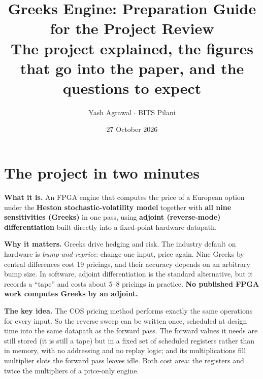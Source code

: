 \documentclass[11pt,a4paper]{article}
\title{\textbf{Greeks Engine: Preparation Guide for the Project Review}\\[3pt]
\large The project explained, the figures that go into the paper, and the questions to expect}
\author{Yash Agrawal \quad $\cdot$ \quad BITS Pilani}
\date{27 October 2026}
\begin{document}
\maketitle
\tableofcontents
\bigskip

\section{The project in two minutes}
\textbf{What it is.} An FPGA engine that computes the price of a European option under the
\textbf{Heston stochastic-volatility model} together with \textbf{all nine sensitivities
(Greeks)} in one pass, using \textbf{adjoint (reverse-mode) differentiation} built directly
into a fixed-point hardware datapath.

\textbf{Why it matters.} Greeks drive hedging and risk. The industry default on hardware is
\emph{bump-and-reprice}: change one input, price again. Nine Greeks by central differences
cost 19 pricings, and their accuracy depends on an arbitrary bump size. In software, adjoint
differentiation is the standard alternative, but it records a ``tape'' and costs about 5--8
pricings in practice. \textbf{No published FPGA work computes Greeks by an adjoint.}

\textbf{The key idea.} The COS pricing method performs exactly the same operations for every
input. So the reverse sweep can be written once, scheduled at design time into the same
datapath as the forward pass. The forward values it needs are still stored (it is still a
tape) but in a fixed set of scheduled registers rather than in memory, with no addressing and
no replay logic; and its multiplications fill multiplier slots the forward pass leaves idle.
Both cost area: the registers and twice the multipliers of a price-only engine.
\end{document}

